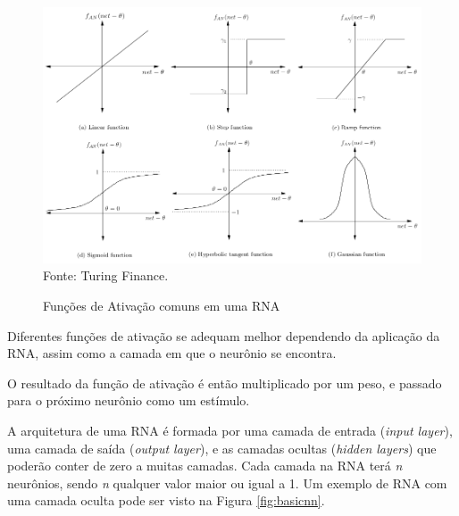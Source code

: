 \documentclass[12pt,a4paper]{article}
\newcommand{\source}[1]{\small Fonte: {#1}}
\begin{document}
	\begin{figure}[ht!]
		\caption{Funções de Ativação comuns em uma RNA}
		\centering
		\includegraphics[scale=0.39]{ActivationFunctions.png}\\
		\vspace{0.5mm}
		\source{Turing Finance.}
		\label{fig:activationFunctions}
	\end{figure}
	
	Diferentes funções de ativação se adequam melhor dependendo da aplicação da RNA,
	assim como a camada em que o neurônio se encontra.
	
	O resultado da função de ativação é então multiplicado por um peso,
	e passado para o próximo neurônio como um estímulo.
	
	A arquitetura de uma RNA é formada por uma camada de entrada (\textit{input layer}),
	uma camada de saída (\textit{output layer}),
	e as camadas ocultas (\textit{hidden layers})
	que poderão conter de zero a muitas camadas.
	Cada camada na RNA terá \textit{n} neurônios,
	sendo \textit{n} qualquer valor maior ou igual a 1.
	Um exemplo de RNA com uma camada oculta pode ser visto na Figura \ref{fig:basicnn}.
	
\end{document}
